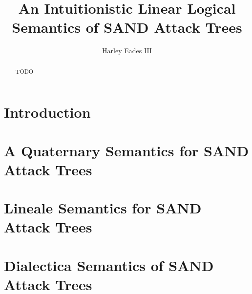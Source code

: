 \documentclass{llncs}
\date{}
\begin{document}
\title{An Intuitionistic Linear Logical Semantics of SAND Attack Trees}

\author{Harley Eades III}

\maketitle 

\begin{abstract}
  TODO
\end{abstract}

\section{Introduction}
\label{sec:introduction}

\section{A Quaternary Semantics for SAND Attack Trees}
\label{sec:a_quaternary_semantics_for_sand_attack_trees}


\section{Lineale Semantics for SAND Attack Trees}
\label{sec:lineale_semantics_for_sand_attack_trees}


\section{Dialectica Semantics of SAND Attack Trees}
\label{sec:dialectica_semantics_of_sand_attack_trees}



\end{document}
